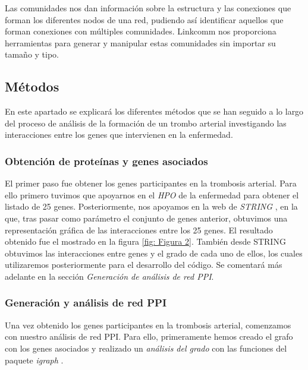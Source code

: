 Las comunidades nos dan información sobre la estructura y las conexiones que forman los diferentes nodos de una red, pudiendo así identificar aquellos que forman conexiones con múltiples comunidades. Linkcomm \cite{linkcomm} nos proporciona herramientas para generar y manipular estas comunidades sin importar su tamaño y tipo.



\subsection{Métodos}

En este apartado se explicará los diferentes métodos que se han seguido a lo largo del proceso de análisis de la formación de un trombo arterial investigando las interacciones entre los genes que intervienen en la enfermedad.


\subsubsection{Obtención de proteínas y genes asociados}

El primer paso fue obtener los genes participantes en la trombosis arterial. Para ello primero tuvimos que apoyarnos en el \textit{HPO} de la enfermedad \cite{HPO} para obtener el listado de 25 genes. Posteriormente, nos apoyamos en la web de \textit{STRING} \cite{STRING} , en la que, tras pasar como parámetro el conjunto de genes anterior, obtuvimos una representación gráfica de las interacciones entre los 25 genes. El resultado obtenido fue el mostrado en la figura \ref{fig: Figura 2}. También desde STRING obtuvimos las interacciones entre genes y el grado de cada uno de ellos, los cuales utilizaremos posteriormente para el desarrollo del código. Se comentará más adelante en la sección \textit{Generación de análisis de red PPI}. \\



\subsubsection{Generación y análisis de red PPI}
Una vez obtenido los genes participantes en la trombosis arterial, comenzamos con nuestro análisis de red PPI. Para ello, primeramente hemos creado el grafo con los genes asociados y realizado un \textit{análisis del grado} con las funciones del paquete \textit{igraph} \cite{igraph}. \\

